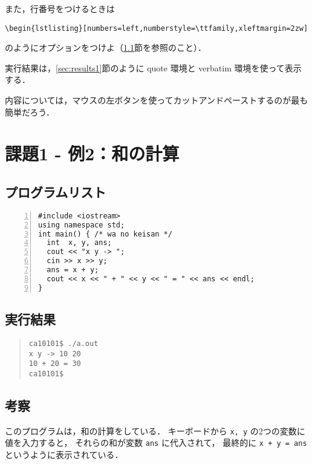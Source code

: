 \documentclass[fontsize=11pt, jafontsize=11pt, paper=a4paper, dvipdfmx]{jlreq}
\begin{document}
また，行番号をつけるときは
\begin{verbatim}
\begin{lstlisting}[numbers=left,numberstyle=\ttfamily,xleftmargin=2zw]
\end{verbatim}
のようにオプションをつけよ（\ref{sec:prog-list2}節を参照のこと）．

実行結果は，\ref{sec:results1}節のように quote 環境と verbatim 環境を使って表示する．

内容については，マウスの左ボタンを使ってカットアンドペーストするのが最も簡単だろう．


\section{課題1 - 例2：和の計算}
\subsection{プログラムリスト}
\label{sec:prog-list2}

\begin{lstlisting}[numbers=left,numberstyle=\ttfamily,xleftmargin=2zw]
#include <iostream>
using namespace std;
int main() { /* wa no keisan */
  int  x, y, ans;
  cout << "x y -> ";
  cin >> x >> y;
  ans = x + y;
  cout << x << " + " << y << " = " << ans << endl;
}
\end{lstlisting}
%
\subsection{実行結果}
\begin{quote}           %
\begin{verbatim}
ca10101$ ./a.out
x y -> 10 20
10 + 20 = 30
ca10101$
\end{verbatim}
\end{quote}
%
\subsection{考察}
このプログラムは，和の計算をしている．
キーボードから \texttt{x, y} の2つの変数に値を入力すると，
それらの和が変数 \texttt{ans} に代入されて，
最終的に \texttt{x + y = ans} というように表示されている．
%
\end{document}
